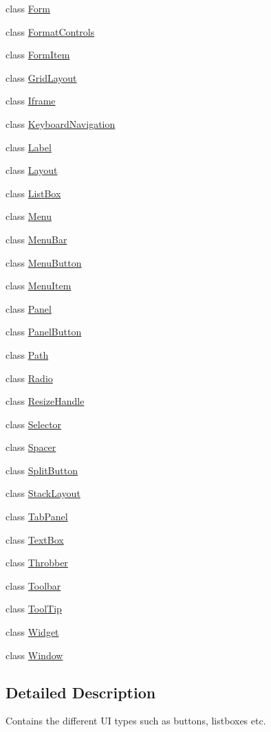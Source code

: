 \begin{DoxyCompactItemize}
class \hyperlink{classtinymce_1_1ui_1_1_form}{Form}
\item 
class \hyperlink{classtinymce_1_1ui_1_1_format_controls}{Format\+Controls}
\item 
class \hyperlink{classtinymce_1_1ui_1_1_form_item}{Form\+Item}
\item 
class \hyperlink{classtinymce_1_1ui_1_1_grid_layout}{Grid\+Layout}
\item 
class \hyperlink{classtinymce_1_1ui_1_1_iframe}{Iframe}
\item 
class \hyperlink{classtinymce_1_1ui_1_1_keyboard_navigation}{Keyboard\+Navigation}
\item 
class \hyperlink{classtinymce_1_1ui_1_1_label}{Label}
\item 
class \hyperlink{classtinymce_1_1ui_1_1_layout}{Layout}
\item 
class \hyperlink{classtinymce_1_1ui_1_1_list_box}{List\+Box}
\item 
class \hyperlink{classtinymce_1_1ui_1_1_menu}{Menu}
\item 
class \hyperlink{classtinymce_1_1ui_1_1_menu_bar}{Menu\+Bar}
\item 
class \hyperlink{classtinymce_1_1ui_1_1_menu_button}{Menu\+Button}
\item 
class \hyperlink{classtinymce_1_1ui_1_1_menu_item}{Menu\+Item}
\item 
class \hyperlink{classtinymce_1_1ui_1_1_panel}{Panel}
\item 
class \hyperlink{classtinymce_1_1ui_1_1_panel_button}{Panel\+Button}
\item 
class \hyperlink{classtinymce_1_1ui_1_1_path}{Path}
\item 
class \hyperlink{classtinymce_1_1ui_1_1_radio}{Radio}
\item 
class \hyperlink{classtinymce_1_1ui_1_1_resize_handle}{Resize\+Handle}
\item 
class \hyperlink{classtinymce_1_1ui_1_1_selector}{Selector}
\item 
class \hyperlink{classtinymce_1_1ui_1_1_spacer}{Spacer}
\item 
class \hyperlink{classtinymce_1_1ui_1_1_split_button}{Split\+Button}
\item 
class \hyperlink{classtinymce_1_1ui_1_1_stack_layout}{Stack\+Layout}
\item 
class \hyperlink{classtinymce_1_1ui_1_1_tab_panel}{Tab\+Panel}
\item 
class \hyperlink{classtinymce_1_1ui_1_1_text_box}{Text\+Box}
\item 
class \hyperlink{classtinymce_1_1ui_1_1_throbber}{Throbber}
\item 
class \hyperlink{classtinymce_1_1ui_1_1_toolbar}{Toolbar}
\item 
class \hyperlink{classtinymce_1_1ui_1_1_tool_tip}{Tool\+Tip}
\item 
class \hyperlink{classtinymce_1_1ui_1_1_widget}{Widget}
\item 
class \hyperlink{classtinymce_1_1ui_1_1_window}{Window}
\end{DoxyCompactItemize}


\subsection{Detailed Description}
Contains the different U\+I types such as buttons, listboxes etc. 
